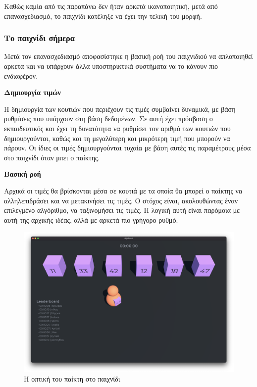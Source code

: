 Καθώς καμία από τις παραπάνω δεν ήταν αρκετά ικανοποιητική, μετά από επανασχεδιασμό, το παιχνίδι κατέληξε να έχει την τελική του μορφή.


\subsubsection{Το παιχνίδι σήμερα}

Μετά τον επανασχεδιασμό αποφασίστηκε η βασική ροή του παιχνιδιού να απλοποιηθεί αρκετα και να υπάρχουν άλλα υποστηρικτικά συστήματα να το κάνουν πιο ενδιαφέρον.

\textbf{Δημιουργία τιμών}

Η δημιουργία των κουτιών που περιέχουν τις τιμές συμβαίνει δυναμικά, με βάση ρυθμίσεις που υπάρχουν στη βάση δεδομένων. Σε αυτή έχει πρόσβαση ο εκπαιδευτικός και έχει τη δυνατότητα να ρυθμίσει τον αριθμό των κουτιών που δημιουργούνται, καθώς και τη μεγαλύτερη και μικρότερη τιμή που μπορούν να πάρουν. Οι ίδιες οι τιμές δημιουργούνται τυχαία με βάση αυτές τις παραμέτρους μέσα στο παιχνίδι όταν μπει ο παίκτης.

\textbf{Βασική ροή}

Αρχικά οι τιμές θα βρίσκονται μέσα σε κουτιά με τα οποία θα μπορεί ο παίκτης να αλληλεπιδράσει και να μετακινήσει τις τιμές. Ο στόχος είναι, ακολουθώντας έναν επιλεγμένο αλγόριθμο, να ταξινομήσει τις τιμές. Η λογική αυτή είναι παρόμοια με αυτή της αρχικής ιδέας, αλλά με αρκετά πιο γρήγορο ρυθμό.

\begin{figure}[H]
    \centering
    \includegraphics[width=0.8\linewidth]{sections/4/2/images/game_solo}
    \caption{Η οπτική του παίκτη στο παιχνίδι}
    \label{fig:game_solo}
\end{figure}

